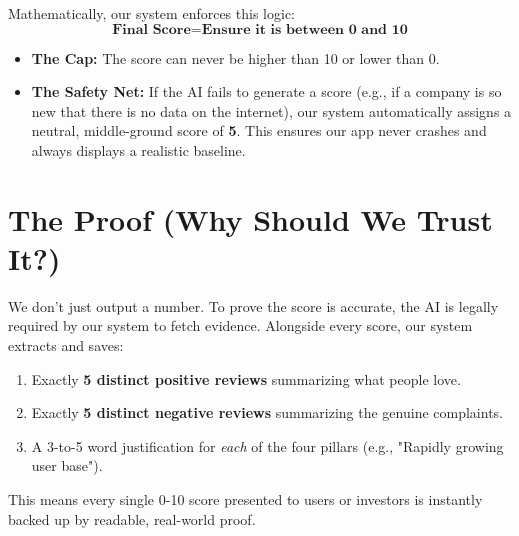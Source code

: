 \documentclass[12pt,a4paper]{article}
\begin{document}
Mathematically, our system enforces this logic:
\[ \textbf{Final Score} = \textbf{Ensure it is between 0 and 10} \]

\begin{itemize}
    \item \textbf{The Cap:} The score can never be higher than 10 or lower than 0.
    \item \textbf{The Safety Net:} If the AI fails to generate a score (e.g., if a company is so new that there is no data on the internet), our system automatically assigns a neutral, middle-ground score of \textbf{5}. This ensures our app never crashes and always displays a realistic baseline.
\end{itemize}

\section*{The Proof (Why Should We Trust It?)}
We don't just output a number. To prove the score is accurate, the AI is legally required by our system to fetch evidence. Alongside every score, our system extracts and saves:
\begin{enumerate}
    \item Exactly \textbf{5 distinct positive reviews} summarizing what people love.
    \item Exactly \textbf{5 distinct negative reviews} summarizing the genuine complaints.
    \item A 3-to-5 word justification for \textit{each} of the four pillars (e.g., "Rapidly growing user base").
\end{enumerate}
This means every single 0-10 score presented to users or investors is instantly backed up by readable, real-world proof.
\end{document}
